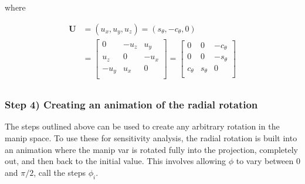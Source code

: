 \noindent where

\begin{align*}
  \textbf{U} &= (u_x, u_y, u_z) =
  (s_\theta, -c_\theta, 0) \\ 
  &=
  \begin{bmatrix}
  0 & -u_z & u_y  \\
  u_z & 0 & -u_x \\
  -u_y & u_x & 0 \\
  \end{bmatrix} =
  \begin{bmatrix}
    0 & 0 & -c_\theta \\
    0 & 0 & -s_\theta \\
    c_\theta & s_\theta & 0 \\
  \end{bmatrix} \\
  \end{align*}

\hypertarget{step-4-creating-an-animation-of-the-radial-rotation}{%
\subsubsection{Step 4) Creating an animation of the radial
rotation}\label{step-4-creating-an-animation-of-the-radial-rotation}}

The steps outlined above can be used to create any arbitrary rotation in
the manip space. To use these for sensitivity analysis, the radial
rotation is built into an animation where the manip var is rotated fully
into the projection, completely out, and then back to the initial value.
This involves allowing \(\phi\) to vary between \(0\) and \(\pi/2\),
call the steps \(\phi_i\).

